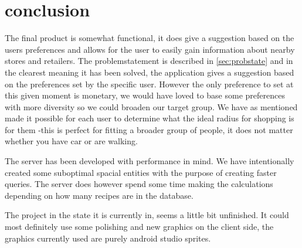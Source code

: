\section{conclusion}
\label{sec:conc}

The final product is somewhat functional, it does give a suggestion based on the users preferences and allows for the user to easily gain information about nearby stores and retailers. The problemstatement is described in \ref{sec:probstate} and in the clearest meaning it has been solved, the application gives a suggestion based on the preferences set by the specific user. However the only preference to set at this given moment is monetary, we would have loved to base some preferences with more diversity so we could broaden our target group. We have as mentioned made it possible for each user to determine what the ideal radius for shopping is for them -this is perfect for fitting a broader group of people, it does not matter whether you have car or are walking.

The server has been developed with performance in mind. We have intentionally created some suboptimal spacial entities with the purpose of creating faster queries. The server does however spend some time making the calculations depending on how many recipes are in the database. 

The project in the state it is currently in, seems a little bit unfinished. It could most definitely use some polishing and new graphics on the client side, the graphics currently used are purely android studio sprites. 

